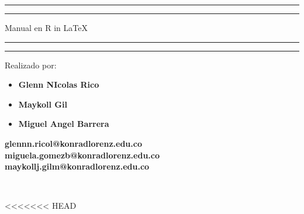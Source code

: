 \documentclass[12pt,hidelinks]{article}
\begin{document}
\begin{titlepage}
	\centering %
	\scshape %
	\vspace*{1.5\baselineskip} %

	\rule{13cm}{1.6pt}\vspace*{-\baselineskip}\vspace*{2pt} %
	\rule{13cm}{0.4pt} %
	
		\vspace{0.75\baselineskip} %
	{	\Huge Manual en R in \LaTeX \\	}
		\vspace{0.75\baselineskip} %
	\rule{13cm}{0.4pt}\vspace*{-\baselineskip}\vspace{3.2pt} %
	\rule{13cm}{1.6pt} %
	
		\vspace{1.75\baselineskip} %
	{\large Realizado por: \begin{itemize}
	    \item \textbf{Glenn NIcolas Rico} 
	    \item \textbf{Maykoll Gil}
	    \item \textbf{Miguel Angel Barrera }
	\end{itemize}
		\vspace*{1.2\baselineskip}
	\textbf{glennn.ricol@konradlorenz.edu.co} \vspace{2mm}\\
	\textbf{miguela.gomezb@konradlorenz.edu.co} \vspace{2mm}\\
	\textbf{maykollj.gilm@konradlorenz.edu.co}} \\
	\vfill

\end{titlepage}
<<<<<<< HEAD
\end{document}
